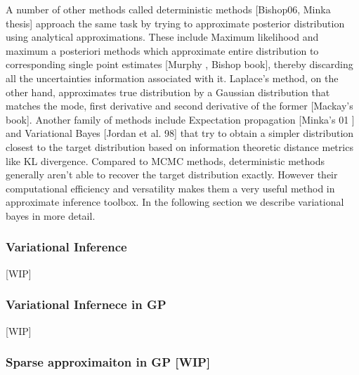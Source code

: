 A number of other methods called deterministic methods [Bishop06, Minka thesis] approach the same task by trying to approximate posterior distribution using analytical approximations. These include Maximum likelihood and maximum a posteriori methods which approximate entire distribution to corresponding single point estimates [Murphy , Bishop book], thereby discarding all the uncertainties information associated with it. Laplace’s method, on the other hand, approximates true distribution by a Gaussian distribution that matches the mode, first derivative and second derivative of the former [Mackay’s book]. Another family of methods include Expectation propagation [Minka’s 01 ] and Variational Bayes [Jordan et al. 98] that try to obtain a simpler distribution closest to the target distribution based on information theoretic distance metrics like KL divergence.  
Compared to MCMC methods, deterministic methods generally aren’t able to recover the target distribution exactly. However their computational efficiency and versatility makes them a very useful method in approximate inference toolbox. In the following section we describe variational bayes in more detail.

\subsubsection{Variational Inference}[WIP]


\subsubsection{Variational Infernece in GP }[WIP]

\subsubsection{Sparse approximaiton in GP [WIP]}